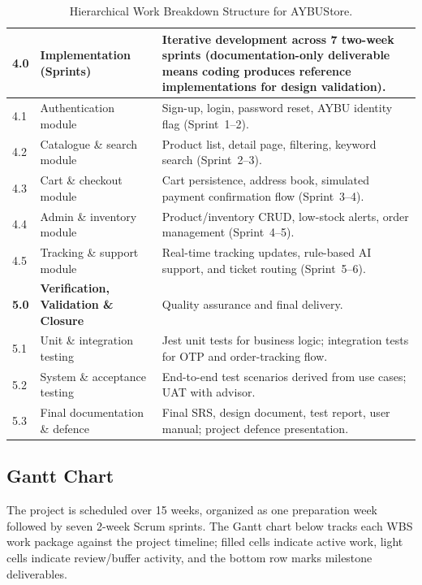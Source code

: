 \documentclass[11pt,a4paper]{article}
\begin{document}
\begin{table}[H]
\begin{tabular}{|p{}|p{}|p{}|}
\rowcolor{aybuBlock}
\textbf{4.0} & \textbf{Implementation (Sprints)} & Iterative
development across 7 two-week sprints (documentation-only deliverable
means coding produces reference implementations for design
validation). \\ \hline
4.1 & Authentication module & Sign-up, login, password reset, AYBU
identity flag (Sprint~1--2). \\ \hline
4.2 & Catalogue \& search module & Product list, detail page,
filtering, keyword search (Sprint~2--3). \\ \hline
4.3 & Cart \& checkout module & Cart persistence, address book,
simulated payment confirmation flow (Sprint~3--4). \\ \hline
4.4 & Admin \& inventory module & Product/inventory CRUD, low-stock
alerts, order management (Sprint~4--5). \\ \hline
4.5 & Tracking \& support module & Real-time tracking updates,
rule-based AI support, and ticket routing (Sprint~5--6). \\ \hline

\rowcolor{aybuBlock}
\textbf{5.0} & \textbf{Verification, Validation \& Closure} & Quality
assurance and final delivery. \\ \hline
5.1 & Unit \& integration testing & Jest unit tests for business
logic; integration tests for OTP and order-tracking flow. \\ \hline
5.2 & System \& acceptance testing & End-to-end test scenarios derived
from use cases; UAT with advisor. \\ \hline
5.3 & Final documentation \& defence & Final SRS, design document,
test report, user manual; project defence presentation. \\ \hline
\end{tabular}
\caption{Hierarchical Work Breakdown Structure for AYBUStore.}
\label{tab:wbs}
\end{table}

\subsection{Gantt Chart}
\label{subsec:gantt}
The project is scheduled over 15 weeks, organized as one preparation
week followed by seven 2-week Scrum sprints. The Gantt chart below
tracks each WBS work package against the project timeline; filled
cells indicate active work, light cells indicate review/buffer
activity, and the bottom row marks milestone deliverables.
\end{document}
